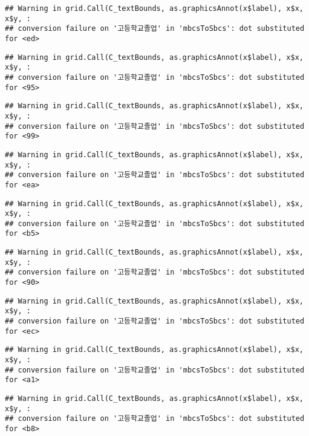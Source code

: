 \documentclass[
]{article}
\begin{document}
\begin{verbatim}
## Warning in grid.Call(C_textBounds, as.graphicsAnnot(x$label), x$x, x$y, :
## conversion failure on '고등학교졸업' in 'mbcsToSbcs': dot substituted for <ed>
\end{verbatim}

\begin{verbatim}
## Warning in grid.Call(C_textBounds, as.graphicsAnnot(x$label), x$x, x$y, :
## conversion failure on '고등학교졸업' in 'mbcsToSbcs': dot substituted for <95>
\end{verbatim}

\begin{verbatim}
## Warning in grid.Call(C_textBounds, as.graphicsAnnot(x$label), x$x, x$y, :
## conversion failure on '고등학교졸업' in 'mbcsToSbcs': dot substituted for <99>
\end{verbatim}

\begin{verbatim}
## Warning in grid.Call(C_textBounds, as.graphicsAnnot(x$label), x$x, x$y, :
## conversion failure on '고등학교졸업' in 'mbcsToSbcs': dot substituted for <ea>
\end{verbatim}

\begin{verbatim}
## Warning in grid.Call(C_textBounds, as.graphicsAnnot(x$label), x$x, x$y, :
## conversion failure on '고등학교졸업' in 'mbcsToSbcs': dot substituted for <b5>
\end{verbatim}

\begin{verbatim}
## Warning in grid.Call(C_textBounds, as.graphicsAnnot(x$label), x$x, x$y, :
## conversion failure on '고등학교졸업' in 'mbcsToSbcs': dot substituted for <90>
\end{verbatim}

\begin{verbatim}
## Warning in grid.Call(C_textBounds, as.graphicsAnnot(x$label), x$x, x$y, :
## conversion failure on '고등학교졸업' in 'mbcsToSbcs': dot substituted for <ec>
\end{verbatim}

\begin{verbatim}
## Warning in grid.Call(C_textBounds, as.graphicsAnnot(x$label), x$x, x$y, :
## conversion failure on '고등학교졸업' in 'mbcsToSbcs': dot substituted for <a1>
\end{verbatim}

\begin{verbatim}
## Warning in grid.Call(C_textBounds, as.graphicsAnnot(x$label), x$x, x$y, :
## conversion failure on '고등학교졸업' in 'mbcsToSbcs': dot substituted for <b8>
\end{verbatim}
\end{document}
